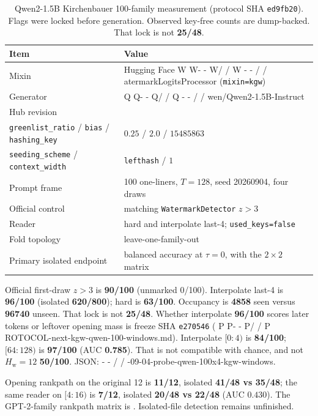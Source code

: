 \documentclass[11pt,a4paper]{article}
\makeatletter
\newcommand{\ttsha}[1]{\texttt{\seqsplit{#1}}}
\newcommand{\ttfile}[1]{\bgroup\ttfamily\ttfile@scan#1\relax\egroup}
\def\ttfile@scan#1{%
  \ifx#1\relax
  \else
    \ifx#1-%
      -\penalty0 %
    \else
      \ifx#1/%
        /\penalty0 %
      \else
        #1%
      \fi
    \fi
    \expandafter\ttfile@scan
  \fi}
\theoremstyle{definition}
\newcommand{\Hw}{H_{\mathrm{w}}}
\makeatother
\begin{document}
\begin{table}[ht]
\centering
\small
\caption{Qwen2-1.5B Kirchenbauer 100-family measurement
(protocol SHA \texttt{ed9fb20}). Flags were locked before generation.
Observed key-free counts are dump-backed. That lock is not \textbf{25/48}.}
\label{tab:kgwq100}
\begin{tabular}{ll}
\toprule
Item & Value \\
\midrule
Mixin & Hugging Face \ttfile{WatermarkLogitsProcessor} (\texttt{mixin=kgw}) \\
Generator & \ttfile{Qwen/Qwen2-1.5B-Instruct} \\
Hub revision & \ttsha{ba1cf1846d7df0a0591d6c00649f57e798519da8} \\
\texttt{greenlist\_ratio} / \texttt{bias} / \texttt{hashing\_key} & $0.25$ / $2.0$ / $15485863$ \\
\texttt{seeding\_scheme} / \texttt{context\_width} & \texttt{lefthash} / $1$ \\
Prompt frame & 100 one-liners, $T=128$, seed 20260904, four draws \\
Official control & matching \texttt{WatermarkDetector} $z>3$ \\
Reader & hard and interpolate last-4; \texttt{used\_keys=false} \\
Fold topology & leave-one-family-out \\
Primary isolated endpoint & balanced accuracy at $\tau=0$, with the $2\times 2$ matrix \\
\bottomrule
\end{tabular}
\end{table}

Official first-draw $z>3$ is \textbf{90/100} (unmarked 0/100).
Interpolate last-4 is \textbf{96/100} (isolated \textbf{620/800});
hard is \textbf{63/100}. Occupancy is \textbf{4858} seen versus
\textbf{96740} unseen. That lock is not \textbf{25/48}.
Whether interpolate \textbf{96/100} scores later tokens or leftover
opening mass is freeze SHA \texttt{e270546}
(\ttfile{PROTOCOL-next-kgw-qwen-100-windows.md}).
Interpolate $[0{:}4)$ is \textbf{84/100}; $[64{:}128)$ is
\textbf{97/100} (AUC \textbf{0.785}). That is not compatible with chance, and not
$\Hw=12$ \textbf{50/100}. JSON:
\ttfile{2026-09-04-probe-qwen-100x4-kgw-windows}.

Opening rankpath on the original 12 is \textbf{11/12}, isolated
\textbf{41/48 vs 35/48}; the same reader on $[4{:}16)$ is \textbf{7/12},
isolated \textbf{20/48 vs 22/48} (AUC $0.430$). The GPT-2-family rankpath
matrix is . Isolated-file detection remains unfinished.
\end{document}
